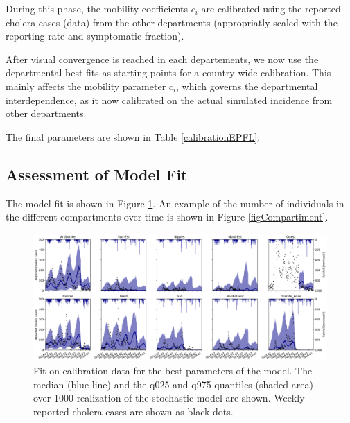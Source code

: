 During this phase, the mobility coefficients $c_i$ are calibrated using the reported cholera cases (data) from the other departments (appropriatly scaled with the reporting rate and symptomatic fraction).

After visual convergence is reached in each departements, we now use the departmental best fits as starting points for a country-wide calibration. This mainly affects the mobility parameter $c_i$, which governs the departmental interdependence, as it now calibrated on the actual simulated incidence from other departments.

The final parameters are shown in Table \ref{calibrationEPFL}.

\subsection{Assessment of Model Fit}
The model fit is shown in Figure \ref{fitEPFL}. An example of the number of individuals in the different compartments over time is shown in Figure \ref{figCompartiment}.

\begin{figure}[htbp]
\begin{center}
\includegraphics[width=1.0\textwidth]{fig_cholera-haiti-ocv/fit.png}
\caption[Fit on calibration data for the best parameter of the model]{Fit on calibration data for the best parameters of the model. The median (blue line) and the q025 and q975 quantiles (shaded area) over 1000 realization of the stochastic model are shown. Weekly reported cholera cases are shown as black dots.}
\label{fitEPFL}
\end{center}
\end{figure}


